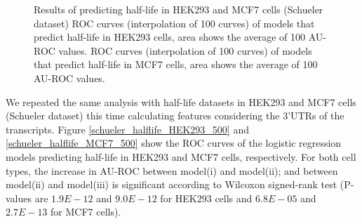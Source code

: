 \begin{figure}[H]
	\centering
\quad
\caption[Optional caption for list of figures]{Results of predicting half-life in HEK293 and MCF7 cells (Schueler dataset)    ROC curves (interpolation of 100 curves) of models that predict half-life in HEK293 cells, area shows the average of 100 AU-ROC values.   ROC curves (interpolation of 100 curves) of models that predict half-life in MCF7 cells, area shows the average of 100 AU-ROC values.}
\label{Schueler_halflife_nostr_nogparclip}
\end{figure}

We repeated the same analysis with half-life datasets in HEK293 and MCF7 cells (Schueler dataset) this time calculating features considering the 3'UTRs of the transcripts. Figure  \ref{schueler_halflife_HEK293_500} and \ref{schueler_halflife_MCF7_500} show the ROC curves of the logistic regression models predicting half-life in HEK293 and MCF7 cells, respectively. For both cell types, the increase in AU-ROC between model(i) and model(ii); and between model(ii) and model(iii) is significant according to Wilcoxon signed-rank test (P-values are $1.9E-12$ and $9.0E-12$ for HEK293 cells and $6.8E-05$ and $2.7E-13$ for MCF7 cells). 

